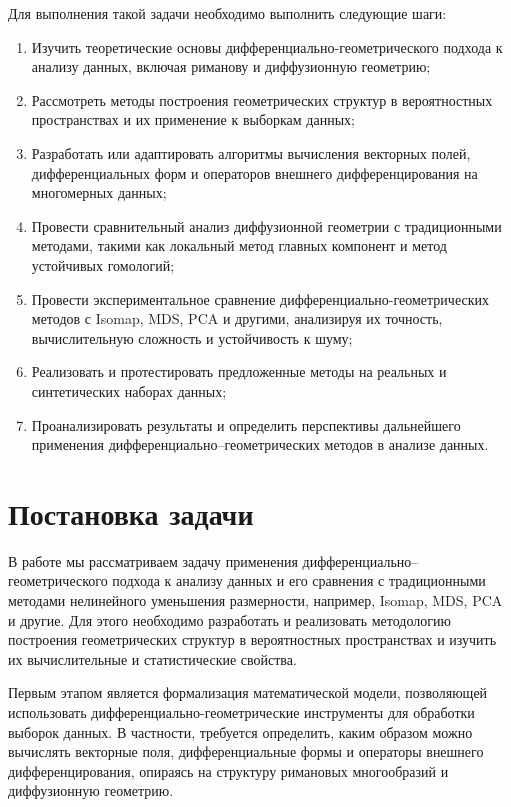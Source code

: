 \documentclass[a4paper,12pt]{extarticle}
\begin{document}
Для выполнения такой задачи необходимо выполнить следующие шаги:

\begin{enumerate}
    \item Изучить теоретические основы дифференциально-геометрического подхода к анализу данных, включая риманову и диффузионную геометрию;
    \item Рассмотреть методы построения геометрических структур в вероятностных пространствах и их применение к выборкам данных;
    \item Разработать или адаптировать алгоритмы вычисления векторных полей, дифференциальных форм и операторов внешнего дифференцирования на многомерных данных;
    \item Провести сравнительный анализ диффузионной геометрии с традиционными методами, такими как локальный метод главных компонент и метод устойчивых гомологий;
    \item Провести экспериментальное сравнение дифференциально-геометрических методов с Isomap, MDS, PCA и другими, анализируя их точность, вычислительную сложность и устойчивость к шуму;
    \item Реализовать и протестировать предложенные методы на реальных и синтетических наборах данных;
    \item Проанализировать результаты и определить перспективы дальнейшего применения дифференциально–геометрических методов в анализе данных.
\end{enumerate}

\section{Постановка задачи}   %

В работе мы рассматриваем задачу применения дифференциально–геометрического подхода к анализу данных и его сравнения с традиционными методами нелинейного уменьшения размерности, например, Isomap, MDS, PCA и другие. Для этого необходимо разработать и реализовать методологию построения геометрических структур в вероятностных пространствах и изучить их вычислительные и статистические свойства.

Первым этапом является формализация математической модели, позволяющей использовать дифференциально-геометрические инструменты для обработки выборок данных. В частности, требуется определить, каким образом можно вычислять векторные поля, дифференциальные формы и операторы внешнего дифференцирования, опираясь на структуру римановых многообразий и диффузионную геометрию.
\end{document}
